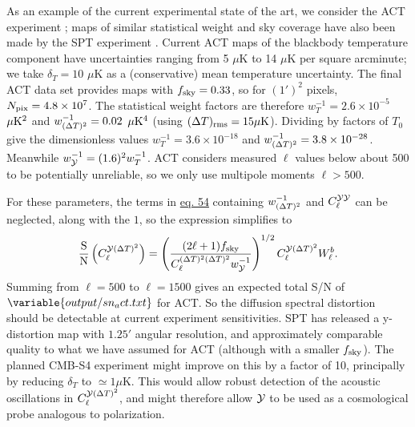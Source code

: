 \documentclass[fleqn,usenatbib]{mnras}
\begin{document}
    As an example of the current experimental state of the art, we consider the
    ACT experiment \citep{Coulton+2023}; maps of similar statistical weight and
    sky coverage have also been made by the SPT experiment \citep{SPTymap}.
    Current ACT maps of the blackbody temperature component have uncertainties
    ranging from 5 $\mu$K to 14 $\mu$K per square arcminute; we take $\delta_T =
    10$ $\mu$K as a (conservative) mean temperature uncertainty.  The final ACT
    data set provides maps with $f_{\rm sky} = 0.33$, so for $(1')^2$ pixels,
    $N_{\rm pix} = 4.8\times 10^7$.  The statistical weight factors are
    therefore
    $w^{-1}_T = 2.6\times 10^{-5}$ $\mu{\rm K}^2$ and
    $w^{-1}_{({\Delta T})^2}=0.02$ $\mu{\rm K}^4$ (using $(\Delta T)_{\rm rms} =
    15\mu{\rm K}$).  Dividing by factors of $T_0$ give the dimensionless values
    $w^{-1}_T =3.6\times 10^{-18}$ and $w^{-1}_{({\Delta T})^2}= 3.8\times
    10^{-28}$.  Meanwhile $w^{-1}_{\cal Y} = (1.6)^2 w^{-1}_T$.  ACT considers
    measured $\ell$ values below about 500 to be potentially unreliable, so we
    only use multipole moments
    $\ell > 500$.

    For these parameters, the terms in \hyperref[eq:cl_sn]{eq. 54} containing
    $w_{({\Delta T})^2}^{-1}$ and $C_\ell^{\mathcal{Y} \mathcal{Y}}$ can be neglected, along with
    the $1$, so the expression simplifies to
    \begin{equation}
        \frac{\rm S}{\rm N}\left(C_\ell^{\mathcal{Y} ({\Delta T})^2}\right)
            = \left(\frac{(2\ell + 1)f_{\rm sky}}{C_\ell^{({\Delta T})^2({\Delta T})^2}w_{\mathcal{Y}}^{-1}}\right)^{1/2}
            C_\ell^{\mathcal{Y} ({\Delta T})^2}W_\ell^b.
    \end{equation}
    Summing from $\ell=500$ to $\ell=1500$ gives an expected total S/N of
    $\variable{output/sn_act.txt}$ for ACT.  So the diffusion spectral
    distortion should be detectable at current experiment sensitivities.  SPT
    has released \citep{SPTymap} a y-distortion map with $1.25'$ angular
    resolution, and approximately comparable quality to what we have assumed for
    ACT (although with a smaller $f_{\rm sky}$).  The planned CMB-S4 experiment
    might improve on this by a factor of 10, principally by reducing $\delta_T$
    to $\simeq 1\mu$K.  This would allow robust detection of the acoustic
    oscillations in $C_\ell^{\mathcal{Y} ({\Delta T})^2}$, and might therefore allow ${\cal
    Y}$ to be used as a cosmological probe analogous to polarization.
\end{document}
